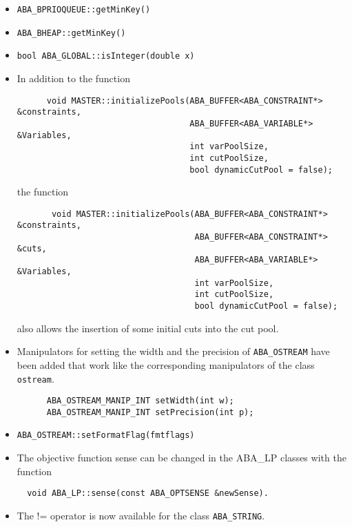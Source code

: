 \begin{itemize}
\item {\tt ABA\_BPRIOQUEUE::getMinKey()}
\item {\tt ABA\_BHEAP::getMinKey()}
\item {\tt bool ABA\_GLOBAL::isInteger(double x)}
\item In addition to the function
      \begin{verbatim}
      void MASTER::initializePools(ABA_BUFFER<ABA_CONSTRAINT*> &constraints,
                                   ABA_BUFFER<ABA_VARIABLE*> &Variables,
                                   int varPoolSize,
                                   int cutPoolSize,
                                   bool dynamicCutPool = false);
      \end{verbatim}
       the function
       \begin{verbatim}
       void MASTER::initializePools(ABA_BUFFER<ABA_CONSTRAINT*> &constraints,
                                    ABA_BUFFER<ABA_CONSTRAINT*> &cuts,
                                    ABA_BUFFER<ABA_VARIABLE*> &Variables,
                                    int varPoolSize,
                                    int cutPoolSize,
                                    bool dynamicCutPool = false);
       \end{verbatim}
       also allows the insertion of some initial cuts into the cut
       pool.

\item Manipulators for setting the width and the precision of
      {\tt ABA\_OSTREAM} have been added that work like the
      corresponding manipulators of the class {\tt ostream}.
      \begin{verbatim}
      ABA_OSTREAM_MANIP_INT setWidth(int w);
      ABA_OSTREAM_MANIP_INT setPrecision(int p);
      \end{verbatim}

\item {\tt  ABA\_OSTREAM::setFormatFlag(fmtflags)}

\item The objective function sense can be changed in the ABA\_LP
  classes with the function
  \begin{verbatim}
  void ABA_LP::sense(const ABA_OPTSENSE &newSense).
  \end{verbatim}

\item The {!=} operator is now available for the class
      {\tt  ABA\_STRING}.
\end{itemize}


